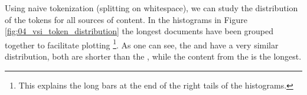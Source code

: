 Using naive tokenization (splitting on whitespace), we can study the distribution of the tokens for all sources of content. In the histograms in Figure \ref{fig:04_vsi_token_distribution} the longest documents have been grouped together to facilitate plotting \footnote{This explains the long bars at the end of the right tails of the histograms.}. As one can see, the \trafilaturaTitle{} and \translationTitle{} have a very similar distribution, both are shorter than the \trafilaturaAbstract{}, while the content from the \trafilaturaFulltext{} is the longest.

\begin{figure}[ht]
    \centering
    \hfill
    

\end{figure}

